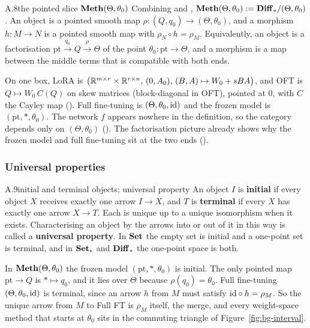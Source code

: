 
\begin{bgentry}{A.8}{the pointed slice $\mathbf{Meth}(\Theta,\theta_0)$}
Combining  and , $\mathbf{Meth}(\Theta,\theta_0):=\mathbf{Diff}_*/(\Theta,\theta_0)$. An object is a pointed smooth
map $\rho:(Q,q_0)\to(\Theta,\theta_0)$, and a morphism $h:M\to N$ is a pointed smooth map with $\rho_N\circ h=\rho_M$.
Equivalently, an object is a factorisation $\mathrm{pt}\xrightarrow{\,q_0\,}Q\xrightarrow{\,\rho\,}\Theta$ of the point
$\theta_0:\mathrm{pt}\to\Theta$, and a morphism is a map between the middle terms that is compatible with both ends.
\end{bgentry}

On one box, LoRA is $\big(\mathbb{R}^{m\times r}\times\mathbb{R}^{r\times n},\,(0,A_0),\,(B,A)\mapsto W_0+sBA\big)$, and OFT
\citep{qiu2023controlling} is $Q\mapsto W_0\,C(Q)$ on skew matrices (block-diagonal in OFT), pointed at $0$, with $C$
the Cayley map (). Full fine-tuning is $(\Theta,\theta_0,\mathrm{id})$ and the frozen model is
$(\mathrm{pt},*,\theta_0)$. The network $f$ appears nowhere in the definition, so the category depends only on
$(\Theta,\theta_0)$ (). The factorisation picture already shows why the frozen model and full
fine-tuning sit at the two ends ().


\subsubsection*{Universal properties}

\begin{bgentry}{A.9}{initial and terminal objects; universal property}
An object $I$ is \textbf{initial} if every object $X$ receives exactly one arrow $I\to X$, and $T$ is \textbf{terminal}
if every $X$ has exactly one arrow $X\to T$. Each is unique up to a unique isomorphism when it exists. Characterising an
object by the arrows into or out of it in this way is called a \textbf{universal property}. In $\mathbf{Set}$ the empty set is
initial and a one-point set is terminal, and in $\mathbf{Set}_*$ and $\mathbf{Diff}_*$ the one-point space is both.
\end{bgentry}

In $\mathbf{Meth}(\Theta,\theta_0)$ the frozen model $(\mathrm{pt},*,\theta_0)$ is initial. The only pointed map
$\mathrm{pt}\to Q$ is $*\mapsto q_0$, and it lies over $\Theta$ because $\rho(q_0)=\theta_0$. Full fine-tuning
$(\Theta,\theta_0,\mathrm{id})$ is terminal, since an arrow $h$ from $M$ must satisfy $\mathrm{id}\circ h=\rho_M$. So the unique arrow
from $M$ to Full FT is $\rho_M$ itself, the merge, and every weight-space method that starts at $\theta_0$ sits in the
commuting triangle of Figure~\ref{fig:bg-interval}.

